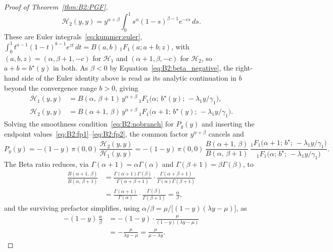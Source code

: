 \begin{proof}[Proof of Theorem~\ref{thm:B2:PGF}]
\[    \mathcal{H}_2(y,y)=y^{\alpha+\beta}\!\int_0^1\! s^{\alpha}(1-s)^{\beta-1}e^{-cs}\,ds.
\]
These are Euler integrals~\eqref{eq:kummer:euler},
$\int_0^1 t^{a-1}(1-t)^{b-1}e^{zt}\,dt=B(a,b)\,{}_1F_1(a;a+b;z)$, with
$(a,b,z)=(\alpha,\beta+1,-c)$ for $\mathcal{H}_1$ and $(\alpha+1,\beta,-c)$ for
$\mathcal{H}_2$, so $a+b=b^\star(y)$ in both. As $\beta<0$ by Equation~\eqref{eq:B2:beta_negative}, the
right-hand side of the Euler identity above is read as its analytic continuation in $b$ beyond the convergence range $b>0$,
giving
\begin{align}
    \mathcal{H}_1(y,y)
        &= B(\alpha,\,\beta+1)\,y^{\alpha+\beta}\,
           {}_1F_1\!\bigl(\alpha;\,b^\star(y);\,-\lambda_1 y/\gamma_1\bigr),
    \label{eq:B2:fp1}\\[3pt]
    \mathcal{H}_2(y,y)
        &= B(\alpha+1,\,\beta)\,y^{\alpha+\beta}\,
           {}_1F_1\!\bigl(\alpha+1;\,b^\star(y);\,-\lambda_1 y/\gamma_1\bigr).
    \label{eq:B2:fp2}
\end{align}
Solving the smoothness condition~\eqref{eq:B2:nobranch} for $P_y(y)$ and inserting the
endpoint values~\eqref{eq:B2:fp1}--\eqref{eq:B2:fp2}, the common factor $y^{\alpha+\beta}$
cancels and
\begin{equation}
    P_y(y)
    = -(1-y)\,\pi(0,0)\,\frac{\mathcal{H}_2(y,y)}{\mathcal{H}_1(y,y)}
    = -(1-y)\,\pi(0,0)\,\frac{B(\alpha+1,\,\beta)}{B(\alpha,\,\beta+1)}\,
        \frac{{}_1F_1\!\bigl(\alpha+1;\,b^\star;\,-\lambda_1 y/\gamma_1\bigr)}
             {{}_1F_1\!\bigl(\alpha;\,b^\star;\,-\lambda_1 y/\gamma_1\bigr)}.
    \label{eq:B2:Py_ratio}
\end{equation}
The Beta ratio reduces, via $\Gamma(\alpha+1)=\alpha\Gamma(\alpha)$ and
$\Gamma(\beta+1)=\beta\Gamma(\beta)$, to
\begin{align}
    \frac{B(\alpha+1,\,\beta)}{B(\alpha,\,\beta+1)}
    &= \frac{\Gamma(\alpha+1)\Gamma(\beta)}{\Gamma(\alpha+\beta+1)}
       \cdot\frac{\Gamma(\alpha+\beta+1)}{\Gamma(\alpha)\Gamma(\beta+1)} \nonumber\\
    &= \frac{\Gamma(\alpha+1)}{\Gamma(\alpha)}\cdot\frac{\Gamma(\beta)}{\Gamma(\beta+1)}
       = \frac{\alpha}{\beta},
    \label{eq:B2:beta_ratio}
\end{align}
and the surviving prefactor simplifies, using
$\alpha/\beta=\mu/\bigl[(1-y)(\lambda y-\mu)\bigr]$, as
\begin{align}
    -(1-y)\,\frac{\alpha}{\beta}
    &= -(1-y)\cdot\frac{\mu}{(1-y)(\lambda y-\mu)} \nonumber\\
    &= -\frac{\mu}{\lambda y-\mu} = \frac{\mu}{\mu-\lambda y}.

\end{align}
\end{proof}
